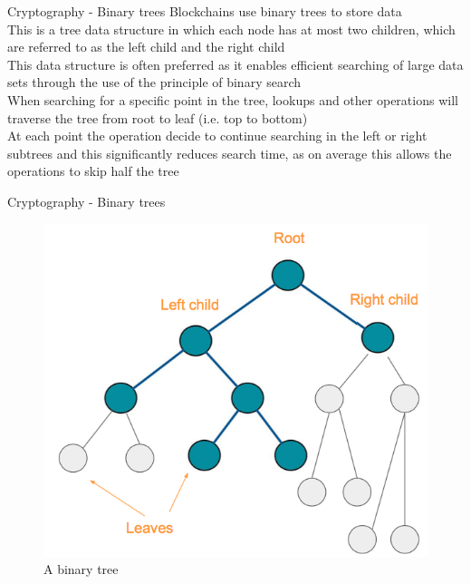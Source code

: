 \documentclass[10pt]{beamer}
\begin{document}
\begin{frame}{Cryptography - Binary trees}
	Blockchains use binary trees to store data \\ \vspace{3mm}
	This is a tree data structure in which each node has at most two children, which are referred to as the left child and the right child \\ \vspace{3mm}
	This data structure is often preferred as it enables efficient searching of large data sets through the use of the principle of binary search \\ \vspace{3mm}
	When searching for a specific point in the tree, lookups and other operations will traverse the tree from root to leaf (i.e. top to bottom)  \\ \vspace{3mm}
	At each point the operation decide to continue searching in the left or right subtrees and this significantly reduces search time, as on average this allows the operations to skip half the tree
\end{frame}


\begin{frame}{Cryptography - Binary trees}
	\begin{figure}[]
		\centering
		\includegraphics  [scale=0.3]{Images/binary}
		\caption{A binary tree}
	\end{figure}
\end{frame}
\end{document}
